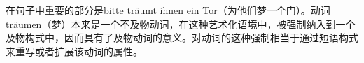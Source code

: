 \noindent
在句子中重要的部分是bitte träumt ihnen ein Tor（为他们梦一个门）。动词träumen（梦）本来是一个不及物动词，在这种艺术化语境中，被强制纳入到一个及物构式中，因而具有了及物动词的意义。对动词的这种强制相当于通过短语构式来重写或者扩展该动词的属性。

